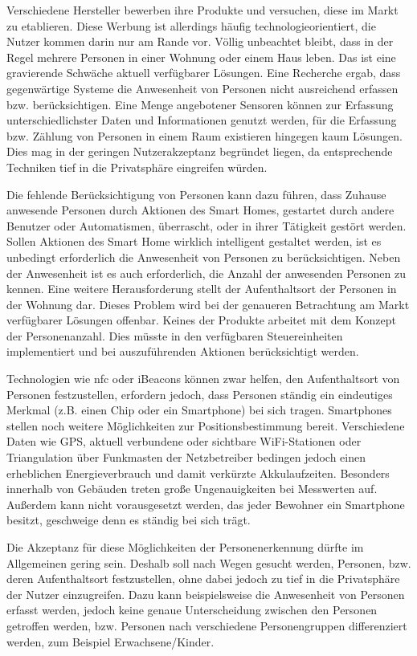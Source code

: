 \documentclass[12pt, oneside, smallheadings]{scrbook}
\begin{document}
Verschiedene Hersteller bewerben ihre Produkte und versuchen, diese im Markt zu etablieren. Diese Werbung ist allerdings häufig technologieorientiert, die Nutzer kommen darin nur am Rande vor. Völlig unbeachtet bleibt, dass in der Regel mehrere Personen in einer Wohnung oder einem Haus leben. Das ist eine gravierende Schwäche aktuell verfügbarer Lösungen. Eine Recherche ergab, dass gegenwärtige Systeme die Anwesenheit von Personen nicht ausreichend erfassen bzw. berücksichtigen. Eine Menge angebotener Sensoren können zur Erfassung unterschiedlichster Daten und Informationen genutzt werden, für die Erfassung bzw. Zählung von Personen in einem Raum existieren hingegen kaum Lösungen. Dies mag in der geringen Nutzerakzeptanz begründet liegen, da entsprechende Techniken tief in die Privatsphäre eingreifen würden.

Die fehlende Berücksichtigung von Personen kann dazu führen, dass Zuhause anwesende Personen durch Aktionen des Smart Homes, gestartet durch andere Benutzer oder Automatismen, überrascht, oder in ihrer Tätigkeit gestört werden. Sollen Aktionen des Smart Home wirklich intelligent gestaltet werden, ist es unbedingt erforderlich die Anwesenheit von Personen zu berücksichtigen. Neben der Anwesenheit ist es auch erforderlich, die Anzahl der anwesenden Personen zu kennen. Eine weitere Herausforderung stellt der Aufenthaltsort der Personen in der Wohnung dar. Dieses Problem wird bei der genaueren Betrachtung am Markt verfügbarer Lösungen offenbar. Keines der Produkte arbeitet mit dem Konzept der Personenanzahl. Dies müsste in den verfügbaren Steuereinheiten implementiert und bei auszuführenden Aktionen berücksichtigt werden.

Technologien wie \gls{nfc} oder iBeacons können zwar helfen, den Aufenthaltsort von Personen festzustellen, erfordern jedoch, dass Personen ständig ein eindeutiges Merkmal (z.B. einen Chip oder ein Smartphone) bei sich tragen. Smartphones stellen noch weitere Möglichkeiten zur Positionsbestimmung bereit. Verschiedene Daten wie GPS, aktuell verbundene oder sichtbare WiFi-Stationen oder Triangulation über Funkmasten der Netzbetreiber bedingen jedoch einen erheblichen Energieverbrauch und damit verkürzte Akkulaufzeiten. Besonders innerhalb von Gebäuden treten große Ungenauigkeiten bei Messwerten auf. Außerdem kann nicht vorausgesetzt werden, das jeder Bewohner ein Smartphone besitzt, geschweige denn es ständig bei sich trägt.

Die Akzeptanz für diese Möglichkeiten der Personenerkennung dürfte im Allgemeinen gering sein. Deshalb soll nach Wegen gesucht werden, Personen, bzw. deren Aufenthaltsort festzustellen, ohne dabei jedoch zu tief in die Privatsphäre der Nutzer einzugreifen. Dazu kann beispielsweise die Anwesenheit von Personen erfasst werden, jedoch keine genaue Unterscheidung zwischen den Personen getroffen werden, bzw. Personen nach verschiedene Personengruppen differenziert werden, zum Beispiel Erwachsene/Kinder.
\end{document}
